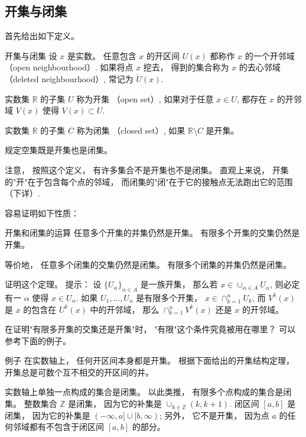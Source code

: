 

\subsection{开集与闭集}

首先给出如下定义。

\begin{definition}{开集与闭集}
设 $x$ 是实数。 任意包含 $x$ 的开区间 $U(x)$ 都称作 $x$ 的一个开邻域 （open neighbourhood）. 如果将点 $x$ 挖去， 得到的集合称为 $x$ 的去心邻域 （deleted neighbourhood）, 常记为 $\mathring U(x)$.

实数集 $\mathbb{R}$ 的子集 $U$ 称为开集 （open set）, 如果对于任意 $x\in U$, 都存在 $x$ 的开邻域 $V(x)$ 使得 $V(x)\subset U$. 

实数集 $\mathbb{R}$ 的子集 $C$ 称为闭集 （closed set）, 如果 $\mathbb{R}\setminus C$ 是开集。

规定空集既是开集也是闭集。
\end{definition}

注意， 按照这个定义， 有许多集合不是开集也不是闭集。 直观上来说， 开集的"开"在于包含每个点的邻域， 而闭集的"闭"在于它的接触点无法跑出它的范围 （下详）.

容易证明如下性质：

\begin{theorem}{开集和闭集的运算}
任意多个开集的并集仍然是开集。 有限多个开集的交集仍然是开集。

等价地， 任意多个闭集的交集仍然是闭集。 有限多个闭集的并集仍然是闭集。
\end{theorem}

\begin{exercise}{}
证明这个定理。 提示： 设 $\{U_\alpha\}_{\alpha\in A}$ 是一族开集， 那么若 $x\in \cup_{\alpha\in A}U_\alpha$, 则必定有一 $\alpha$ 使得 $x\in U_\alpha$. 如果 $U_1,...,U_n$ 是有限多个开集， $x\in\cap_{k=1}^nU_k$, 而 $V^k(x)$ 是 $x$ 的包含在 $U^k(x)$ 中的开邻域， 那么 $\cap_{k=1}^nV^k(x)$ 还是 $x$ 的开邻域。
\end{exercise}

\begin{exercise}{}
在证明"有限多开集的交集还是开集"时， "有限"这个条件究竟被用在哪里？ 可以参考下面的例子。
\end{exercise}

\begin{example}{例子}
在实数轴上， 任何开区间本身都是开集。 根据下面给出的开集结构定理， 开集总是可数个互不相交的开区间的并。

实数轴上单独一点构成的集合是闭集。 以此类推， 有限多个点构成的集合是闭集。 整数集合 $\mathbb{Z}$ 是闭集， 因为它的补集是 $\cup_{k\in\mathbb{Z}}(k,k+1)$. 闭区间 $[a,b]$ 是闭集， 因为它的补集是 $(-\infty,a]\cup[b,\infty)$; 另外， 它不是开集， 因为点 $a$ 的任何邻域都有不包含于闭区间 $[a,b]$ 的部分。
\end{example}

